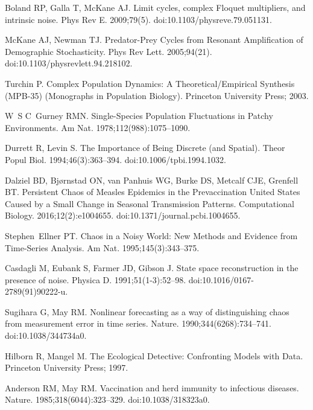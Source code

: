 \documentclass[10pt,letterpaper]{article}
\begin{document}
\begin{thebibliography}{10}
Boland RP, Galla T, McKane AJ.
\newblock Limit cycles, complex {Floquet} multipliers, and intrinsic noise.
\newblock Phys Rev E. 2009;79(5).
\newblock doi:{10.1103/physreve.79.051131}.

McKane AJ, Newman TJ.
\newblock Predator-Prey Cycles from Resonant Amplification of Demographic
  Stochasticity.
\newblock Phys Rev Lett. 2005;94(21).
\newblock doi:{10.1103/physrevlett.94.218102}.

Turchin P.
\newblock Complex Population Dynamics: A Theoretical/Empirical Synthesis
  (MPB-35) (Monographs in Population Biology).
\newblock Princeton University Press; 2003.

W~S C~Gurney RMN.
\newblock Single-Species Population Fluctuations in Patchy Environments.
\newblock Am Nat. 1978;112(988):1075--1090.

Durrett R, Levin S.
\newblock The Importance of Being Discrete (and Spatial).
\newblock Theor Popul Biol. 1994;46(3):363--394.
\newblock doi:{10.1006/tpbi.1994.1032}.

Dalziel BD, Bj{\o}rnstad ON, van Panhuis WG, Burke DS, Metcalf CJE, Grenfell
  BT.
\newblock Persistent Chaos of Measles Epidemics in the Prevaccination United
  States Caused by a Small Change in Seasonal Transmission Patterns.
 Computational Biology. 2016;12(2):e1004655.
\newblock doi:{10.1371/journal.pcbi.1004655}.

Stephen~Ellner PT.
\newblock Chaos in a Noisy World: New Methods and Evidence from Time-Series
  Analysis.
\newblock Am Nat. 1995;145(3):343--375.

Casdagli M, Eubank S, Farmer JD, Gibson J.
\newblock State space reconstruction in the presence of noise.
\newblock Physica D. 1991;51(1-3):52--98.
\newblock doi:{10.1016/0167-2789(91)90222-u}.

Sugihara G, May RM.
\newblock Nonlinear forecasting as a way of distinguishing chaos from
  measurement error in time series.
\newblock Nature. 1990;344(6268):734--741.
\newblock doi:{10.1038/344734a0}.

Hilborn R, Mangel M.
\newblock The Ecological Detective: Confronting Models with Data.
\newblock Princeton University Press; 1997.

Anderson RM, May RM.
\newblock Vaccination and herd immunity to infectious diseases.
\newblock Nature. 1985;318(6044):323--329.
\newblock doi:{10.1038/318323a0}.


\end{thebibliography}
\end{document}
